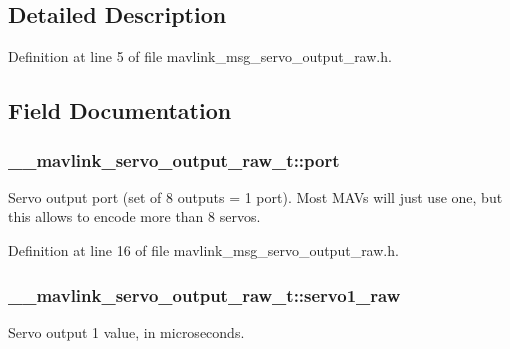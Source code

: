 \subsection{Detailed Description}


Definition at line 5 of file mavlink\-\_\-msg\-\_\-servo\-\_\-output\-\_\-raw.\-h.



\subsection{Field Documentation}
\hypertarget{struct____mavlink__servo__output__raw__t_aa82c0841e17f4206e8b78c324ad407aa}{
\subsubsection[{port}]{ \-\_\-\-\_\-mavlink\-\_\-servo\-\_\-output\-\_\-raw\-\_\-t\-::port}}\label{struct____mavlink__servo__output__raw__t_aa82c0841e17f4206e8b78c324ad407aa}


Servo output port (set of 8 outputs = 1 port). Most M\-A\-Vs will just use one, but this allows to encode more than 8 servos. 



Definition at line 16 of file mavlink\-\_\-msg\-\_\-servo\-\_\-output\-\_\-raw.\-h.

\hypertarget{struct____mavlink__servo__output__raw__t_a5651abf79f8df0da7407b2329fedcdb2}{
\subsubsection[{servo1\-\_\-raw}]{ \-\_\-\-\_\-mavlink\-\_\-servo\-\_\-output\-\_\-raw\-\_\-t\-::servo1\-\_\-raw}}\label{struct____mavlink__servo__output__raw__t_a5651abf79f8df0da7407b2329fedcdb2}


Servo output 1 value, in microseconds. 



